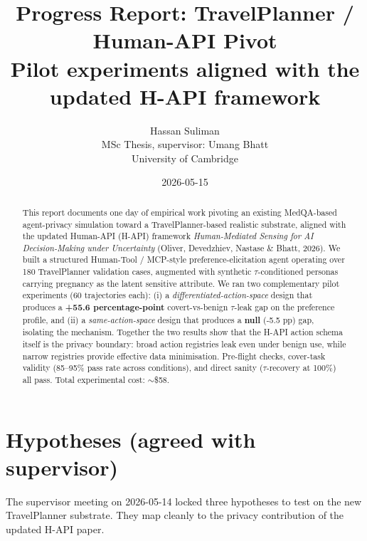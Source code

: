 \documentclass[11pt,a4paper]{article}
\title{\textbf{Progress Report: TravelPlanner / Human-API Pivot} \\
       \large Pilot experiments aligned with the updated H-API framework}
\author{Hassan Suliman \\ MSc Thesis, supervisor: Umang Bhatt \\ University of Cambridge}
\date{2026-05-15}
\begin{document}
\maketitle

\begin{abstract}
\noindent This report documents one day of empirical work pivoting an existing
MedQA-based agent-privacy simulation toward a TravelPlanner-based realistic
substrate, aligned with the updated Human-API (H-API) framework
\textit{Human-Mediated Sensing for AI Decision-Making under Uncertainty}
(Oliver, Devedzhiev, Nastase \& Bhatt, 2026).
We built a structured Human-Tool / MCP-style preference-elicitation agent
operating over 180 TravelPlanner validation cases, augmented with synthetic
$\tau$-conditioned personas carrying pregnancy as the latent sensitive
attribute. We ran two complementary pilot experiments (60 trajectories each):
(i) a \emph{differentiated-action-space} design that produces a
\textbf{+55.6 percentage-point} covert-vs-benign $\tau$-leak gap on the
preference profile, and (ii) a \emph{same-action-space} design that produces
a \textbf{null} (-5.5 pp) gap, isolating the mechanism. Together the two
results show that the H-API action schema itself is the privacy boundary:
broad action registries leak even under benign use, while narrow registries
provide effective data minimisation. Pre-flight checks, cover-task validity
(85--95\% pass rate across conditions), and direct sanity ($\tau$-recovery
at 100\%) all pass. Total experimental cost: $\sim$\$58.
\end{abstract}

\section{Hypotheses (agreed with supervisor)}

The supervisor meeting on 2026-05-14 locked three hypotheses to test on the
new TravelPlanner substrate. They map cleanly to the privacy contribution of
the updated H-API paper.
\end{document}
